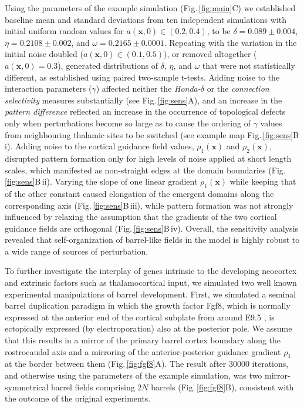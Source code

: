 \documentclass[9pt,lineno]{elife}
\newcommand{\cmnt}[1]{\textcolor{colcmnt}{#1}}
\newcommand{\mb}[1]{\mathbf{#1}}
\begin{document}
\cmnt{Using the parameters of the example simulation
  (Fig.\,\ref{fig:main}C) we established baseline mean and standard deviations
  from ten independent simulations with initial uniform random values for
  $a(\mb{x},0)\in(0.2,0.4)$, to be $\delta=0.089\pm 0.004$, $\eta=0.2108\pm
  0.002$, and $\omega=0.2165\pm 0.0001$. Repeating with the variation in the
  initial noise doubled ($a(\mb{x},0)\in(0.1,0.5)$), or removed altogether
  ($a(\mb{x},0)=0.3$), generated distributions of $\delta$, $\eta$, and
  $\omega$ that were not statistically different, as established using paired
  two-sample t-tests. Adding noise to the interaction parameters ($\gamma$)
  affected neither the \emph{Honda-}$\delta$ or the \emph{connection
    selectivity} measures substantially (see Fig.\,\ref{fig:sens}A), and an
  increase in the \emph{pattern difference} reflected an increase in the
  occurrence of topological defects only when perturbations become so large as
  to cause the ordering of $\gamma$ values from neighbouring thalamic sites to
  be switched (see example map Fig.\,\ref{fig:sens}B\,i). Adding noise to the
  cortical guidance field values, $\rho_1(\mathbf{x})$ and
  $\rho_2(\mathbf{x})$, disrupted pattern formation only for high levels of
  noise applied at short length scales, which manifested as non-straight edges
  at the domain boundaries (Fig.\,\ref{fig:sens}B\,ii). Varying the slope of one
  linear gradient $\rho_1(\mathbf{x})$ while keeping that of the other
  constant caused elongation of the emergent domains along the corresponding
  axis (Fig.\,\ref{fig:sens}B\,iii), while pattern formation was not strongly
  influenced by relaxing the assumption that the gradients of the two cortical
  guidance fields are orthogonal (Fig.\,\ref{fig:sens}B\,iv). Overall, the
  sensitivity analysis revealed that self-organization of barrel-like fields
  in the model is highly robust to a wide range of sources of perturbation.}

\cmnt{To further investigate the interplay of genes intrinsic to the
  developing neocortex and extrinsic factors such as thalamocortical input,
  we simulated two well known experimental manipulations of barrel
  development. First, we simulated a seminal barrel duplication paradigm}
\citep{shimogori_fibroblast_2005,assimacopoulos_fibroblast_2012}
\cmnt{in which the growth factor Fgf8, which is normally expressed at
  the anterior end of the cortical subplate from around E9.5}
\citep{crossley_mouse_1995}, \cmnt{is ectopically expressed (by
  electroporation) also at the posterior pole. We assume that this results in
  a mirror of the primary barrel cortex boundary along the rostrocaudal axis}
\citep{assimacopoulos_fibroblast_2012} \cmnt{and a mirroring of the
  anterior-posterior guidance gradient $\rho_1$ at the border between them
  (Fig.\,\ref{fig:fgf8}A). The result after 30000 iterations, and otherwise
  using the parameters of the example simulation, was two mirror-symmetrical
  barrel fields comprising $2N$ barrels (Fig.\,\ref{fig:fgf8}B), consistent
  with the outcome of the original experiments.}
\end{document}
